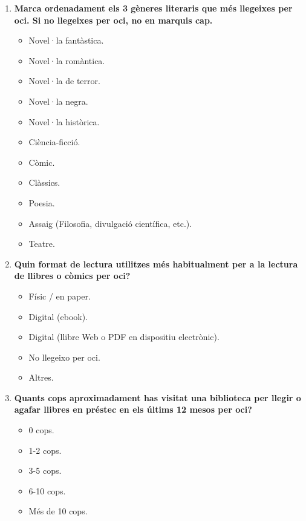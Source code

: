 \documentclass[12pt]{article}
\begin{document}
\begin{enumerate}
    \item \textbf{Marca ordenadament els 3 gèneres literaris que més llegeixes per oci. Si no llegeixes per oci, no en marquis cap.}
    \begin{itemize}
        \item[$\_$] Novel·la fantàstica.
        \item[$\_$] Novel·la romàntica.
        \item[$\_$] Novel·la de terror.
        \item[$\_$] Novel·la negra.
        \item[$\_$] Novel·la històrica.
        \item[$\_$] Ciència-ficció.
        \item[$\_$] Còmic.
        \item[$\_$] Clàssics.
        \item[$\_$] Poesia.
        \item[$\_$] Assaig (Filosofia, divulgació científica, etc.).
        \item[$\_$] Teatre.
    \end{itemize}
    
    \item \textbf{Quin format de lectura utilitzes més habitualment per a la lectura de llibres o còmics per oci?}
    \begin{itemize}
        \item[$\square$] Físic / en paper.
        \item[$\square$] Digital (ebook).
        \item[$\square$] Digital (llibre Web o PDF en dispositiu electrònic).
        \item[$\square$] No llegeixo per oci.
        \item[$\square$] Altres.
    \end{itemize}

    \item \textbf{Quants cops aproximadament has visitat una biblioteca per llegir o agafar llibres en préstec en els últims 12 mesos per oci?}
    \begin{itemize}
        \item[$\square$] 0 cops.
        \item[$\square$] 1-2 cops.
        \item[$\square$] 3-5 cops.
        \item[$\square$] 6-10 cops.
        \item[$\square$] Més de 10 cops.
    \end{itemize}


\end{enumerate}
\end{document}
